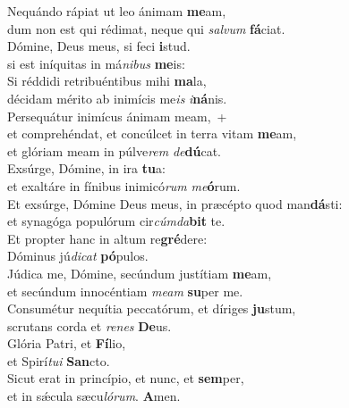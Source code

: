 \evenverse Nequándo rápiat ut leo ánimam \textbf{me}am,~\*\\
\evenverse dum non est qui rédimat, neque qui \textit{sal}\textit{vum} \textbf{fá}ciat.\\
\oddverse Dómine, Deus meus, si feci \textbf{i}stud.~\*\\
\oddverse si est iníquitas in má\textit{ni}\textit{bus} \textbf{me}is:\\
\evenverse Si réddidi retribuéntibus mihi \textbf{ma}la,~\*\\
\evenverse décidam mérito ab inimícis me\textit{is} \textit{i}\textbf{ná}nis.\\
\oddverse Persequátur inimícus ánimam meam,~+\\
\oddverse  et comprehéndat, et concúlcet in terra vitam \textbf{me}am,~\*\\
\oddverse et glóriam meam in púlve\textit{rem} \textit{de}\textbf{dú}cat.\\
\evenverse Exsúrge, Dómine, in ira \textbf{tu}a:~\*\\
\evenverse et exaltáre in fínibus inimicó\textit{rum} \textit{me}\textbf{ó}rum.\\
\oddverse Et exsúrge, Dómine Deus meus, in præcépto quod man\textbf{dá}sti:~\*\\
\oddverse et synagóga populórum cir\textit{cúm}\textit{da}\textbf{bit} te.\\
\evenverse Et propter hanc in altum re\textbf{gré}dere:~\*\\
\evenverse Dóminus jú\textit{di}\textit{cat} \textbf{pó}pulos.\\
\oddverse Júdica me, Dómine, secúndum justítiam \textbf{me}am,~\*\\
\oddverse et secúndum innocéntiam \textit{me}\textit{am} \textbf{su}per me.\\
\evenverse Consumétur nequítia peccatórum, et díriges \textbf{ju}stum,~\*\\
\evenverse scrutans corda et \textit{re}\textit{nes} \textbf{De}us.\\
\oddverse Glória Patri, et \textbf{Fí}lio,~\*\\
\oddverse et Spirí\textit{tu}\textit{i} \textbf{San}cto.\\
\evenverse Sicut erat in princípio, et nunc, et \textbf{sem}per,~\*\\
\evenverse et in sǽcula sæcu\textit{ló}\textit{rum}. \textbf{A}men.\\
